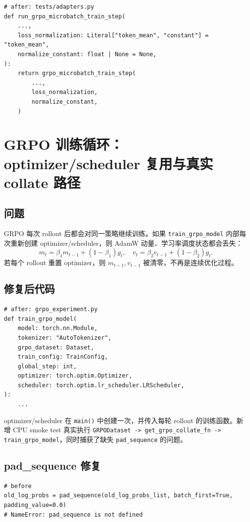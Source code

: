 \documentclass[UTF8,a4paper,11pt]{ctexart}
\begin{document}
\begin{lstlisting}
# after: tests/adapters.py
def run_grpo_microbatch_train_step(
    ...,
    loss_normalization: Literal["token_mean", "constant"] = "token_mean",
    normalize_constant: float | None = None,
):
    return grpo_microbatch_train_step(
        ...,
        loss_normalization,
        normalize_constant,
    )
\end{lstlisting}

\section{GRPO 训练循环：optimizer/scheduler 复用与真实 collate 路径}

\subsection{问题}

GRPO 每次 rollout 后都会对同一策略继续训练。如果 \texttt{train\_grpo\_model} 内部每次重新创建 optimizer/scheduler，则 AdamW 动量、学习率调度状态都会丢失：
\[
  m_t=\beta_1 m_{t-1}+(1-\beta_1)g_t,
  \quad
  v_t=\beta_2 v_{t-1}+(1-\beta_2)g_t.
\]
若每个 rollout 重置 optimizer，则 $m_{t-1},v_{t-1}$ 被清零，不再是连续优化过程。

\subsection{修复后代码}

\begin{lstlisting}
# after: grpo_experiment.py
def train_grpo_model(
    model: torch.nn.Module,
    tokenizer: "AutoTokenizer",
    grpo_dataset: Dataset,
    train_config: TrainConfig,
    global_step: int,
    optimizer: torch.optim.Optimizer,
    scheduler: torch.optim.lr_scheduler.LRScheduler,
):
    ...
\end{lstlisting}

optimizer/scheduler 在 \texttt{main()} 中创建一次，并传入每轮 rollout 的训练函数。新增 CPU smoke test 真实执行 \texttt{GRPODataset -> get\_grpo\_collate\_fn -> train\_grpo\_model}，同时捕获了缺失 \texttt{pad\_sequence} 的问题。

\subsection{pad\_sequence 修复}

\begin{lstlisting}
# before
old_log_probs = pad_sequence(old_log_probs_list, batch_first=True, padding_value=0.0)
# NameError: pad_sequence is not defined
\end{lstlisting}
\end{document}

